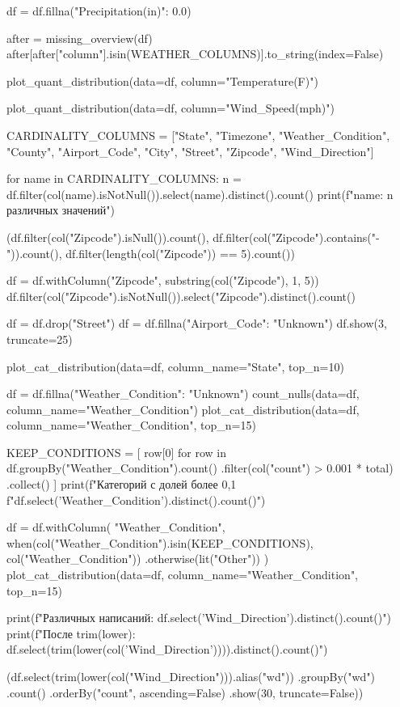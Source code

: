 \begin{code}
df = df.fillna({"Precipitation(in)": 0.0})

after = missing_overview(df)
after[after["column"].isin(WEATHER_COLUMNS)].to_string(index=False)

plot_quant_distribution(data=df, column="Temperature(F)")

plot_quant_distribution(data=df, column="Wind_Speed(mph)")

CARDINALITY_COLUMNS = ["State", "Timezone", "Weather_Condition", "County",
                          "Airport_Code", "City", "Street", "Zipcode",
                          "Wind_Direction"]

for name in CARDINALITY_COLUMNS:
    n = df.filter(col(name).isNotNull()).select(name).distinct().count()
    print(f"{name}: {n} различных значений")

(df.filter(col("Zipcode").isNull()).count(),
 df.filter(col("Zipcode").contains("-")).count(),
 df.filter(length(col("Zipcode")) == 5).count())

df = df.withColumn("Zipcode", substring(col("Zipcode"), 1, 5))
df.filter(col("Zipcode").isNotNull()).select("Zipcode").distinct().count()

df = df.drop("Street")
df = df.fillna({"Airport_Code": "Unknown"})
df.show(3, truncate=25)

plot_cat_distribution(data=df, column_name="State", top_n=10)

df = df.fillna({"Weather_Condition": "Unknown"})
count_nulls(data=df, column_name="Weather_Condition")
plot_cat_distribution(data=df, column_name="Weather_Condition", top_n=15)

KEEP_CONDITIONS = [
    row[0] for row in
    df.groupBy("Weather_Condition").count()
      .filter(col("count") > 0.001 * total)
      .collect()
]
print(f"Категорий с долей более 0,1%
      f"{df.select('Weather_Condition').distinct().count()}")

df = df.withColumn(
    "Weather_Condition",
    when(col("Weather_Condition").isin(KEEP_CONDITIONS), col("Weather_Condition"))
    .otherwise(lit("Other"))
)
plot_cat_distribution(data=df, column_name="Weather_Condition", top_n=15)

print(f"Различных написаний: {df.select('Wind_Direction').distinct().count()}")
print(f"После trim(lower): {df.select(trim(lower(col('Wind_Direction')))).distinct().count()}")

(df.select(trim(lower(col("Wind_Direction"))).alias("wd"))
   .groupBy("wd")
   .count()
   .orderBy("count", ascending=False)
   .show(30, truncate=False))


\end{code}
